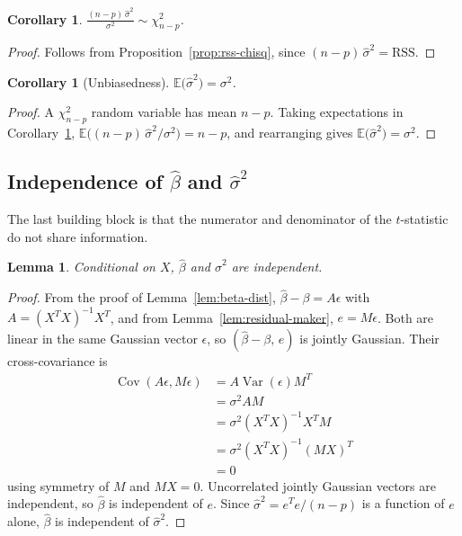 \documentclass[11pt]{article}
\newtheorem{lemma}[theorem]{Lemma}
\newtheorem{corollary}[theorem]{Corollary}
\theoremstyle{definition}
\begin{document}
\begin{corollary}\label{cor:s2-dist}
    $\displaystyle \frac{(n-p)\,\widehat{\sigma}^2}{\sigma^2} \sim \chi^2_{n-p}$.
\end{corollary}

\begin{proof}
    Follows from Proposition~\ref{prop:rss-chisq}, since
    $(n-p)\,\widehat{\sigma}^2 = \mathrm{RSS}$.
\end{proof}

\begin{corollary}[Unbiasedness]
    $\mathbb{E}\big(\widehat{\sigma}^2\big) = \sigma^2$.
\end{corollary}

\begin{proof}
    A $\chi^2_{n-p}$ random variable has mean $n-p$. Taking expectations in
    Corollary~\ref{cor:s2-dist},
    $\mathbb{E}\big((n-p)\,\widehat{\sigma}^2/\sigma^2\big) = n-p$, and rearranging
    gives $\mathbb{E}\big(\widehat{\sigma}^2\big) = \sigma^2$.
\end{proof}

\subsection{Independence of $\widehat{\beta}$ and $\widehat{\sigma}^2$}
The last building block is that the numerator and denominator of the
$t$-statistic do not share information.

\begin{lemma}\label{lem:independence}
    Conditional on $X$, $\widehat{\beta}$ and $\widehat{\sigma}^2$ are independent.
\end{lemma}

\begin{proof}
    From the proof of Lemma~\ref{lem:beta-dist}, $\widehat{\beta} - \beta = A\epsilon$
    with $A = (X^T X)^{-1} X^T$, and from Lemma~\ref{lem:residual-maker},
    $e = M\epsilon$. Both are linear in the same Gaussian vector $\epsilon$,
    so $(\widehat{\beta} - \beta, \, e)$ is jointly Gaussian. Their cross-covariance is
    \begin{align*}
        \operatorname{Cov}(A\epsilon, M\epsilon) &= A \operatorname{Var}(\epsilon) M^T \\
                                                 &= \sigma^2 A M \\
                                                 &= \sigma^2 (X^T X)^{-1} X^T M \\
                                                 &= \sigma^2 (X^T X)^{-1} (M X)^T \\
                                                 &= 0
    \end{align*}
    using symmetry of $M$ and $MX = 0$. Uncorrelated jointly Gaussian vectors
    are independent, so $\widehat{\beta}$ is independent of $e$. Since
    $\widehat{\sigma}^2 = e^T e / (n-p)$ is a function of $e$ alone, $\widehat{\beta}$ is
    independent of $\widehat{\sigma}^2$.
\end{proof}
\end{document}
